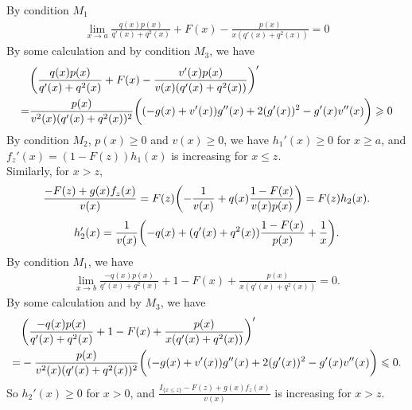 \documentclass[a4paper,11pt,draft]{article}
\makeatletter
\numberwithin{equation}{section}
\theoremstyle{plain}
\theoremstyle{definition}
\theoremstyle{remark}
\let\original@left\left
\let\original@right\right
\renewcommand{\left}{\mathopen{}\mathclose\bgroup\original@left}
\renewcommand{\right}{\aftergroup\egroup\original@right}
\renewcommand{\leq}{\leqslant}
\renewcommand{\geq}{\geqslant}
\makeatother
\begin{document}
By condition $M_{1}$
\begin{equation}\label{5_16_4}
\begin{aligned}
	\lim_{x\to a} \frac{q(x)p(x)}{q'(x)+q^2(x)}+F(x)-\frac{p(x)}{x(q'(x)+q^2(x))}=0
\end{aligned}
\end{equation}
By some calculation and by condition $M_{3}$, we have 
\begin{equation}\label{p6}
\begin{aligned}
&\left(\frac{q(x)p(x)}{q'(x)+q^2(x)}+F(x)-\frac{v'(x)p(x)}{v(x)(q'(x)+q^2(x))}
	\right)'\\=& \frac{p(x)}{v^{2}(x) (q'(x)+q^{2}(x))^{2}}  \biggl(
(-g(x)+v'(x))g''(x)+2(g'(x))^{2}-g'(x)v''(x)  \biggr)\geq 0
\end{aligned}
\end{equation}
By condition $M_{2}$, $p(x)\geq 0$ and $v(x)\geq 0$, we have $h_1'(x)\geq 0$ for $x\geq a$, and
$f_z'(x)=(1-F(z))h_1(x)$ is increasing for $x\leq z.$\\ 
	\indent Similarly, for $x> z$,
\begin{equation}\label{p2_2}
\begin{aligned}
	\frac{-F(z)+g(x)f_{z}(x)}{v(x)}=F(z)\left(
	-\frac{1}{v(x)}+q(x)\frac{1-F(x)}{v(x)p(x)}\right)=F(z) h_2(x) .
\end{aligned}
\end{equation}
\begin{equation}\label{p3_2}
\begin{aligned}
	h_2'(x)=\frac{1}{v(x)}\left( -q(x)+(q'(x)+q^2(x))
\frac{1-F(x)}{p(x)}+\frac{1}{x}\right). 
\end{aligned}
\end{equation}
By condition $M_{1}$, we have 
\begin{equation}\label{p5_2}
\begin{aligned}
\lim\limits_{x\rightarrow b}\frac{-q(x)p(x)}{q'(x)+q^2(x)}+1-F(x)+\frac{p(x)}{x(q'(x)+q^2(x))}= 0.
\end{aligned}
\end{equation}
By some calculation and by $M_{3}$, we have 
\begin{equation}\label{p6_2}
\begin{aligned}
&\left(\frac{-q(x)p(x)}{q'(x)+q^2(x)}+1-F(x)+\frac{p(x)}{x(q'(x)+q^2(x))}
\right)' \\=& -\frac{p(x)}{v^{2}(x) (q'(x)+q^{2}(x))^{2}}  \biggl(
(-g(x)+v'(x))g''(x)+2(g'(x))^{2}-g'(x)v''(x)  \biggr)\leq 0.
\end{aligned}
\end{equation}
So $h_2'(x) \geq 0$ for $x>0$, and
$\frac{I_{\{x\leq z\}}-F(z)+g(x)f_{z}(x)}{v(x)}$ is increasing for $x> z.$
\endproof
\end{document}

